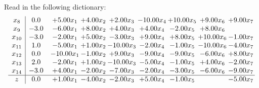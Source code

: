 \documentclass[9pt]{article}
\begin{document}
Read in the following dictionary:
\[\begin{array}{c| c c@{\hskip 2pt} c@{\hskip 2pt} c@{\hskip 2pt} c@{\hskip 2pt} c@{\hskip 2pt} c@{\hskip 2pt} c@{\hskip 2pt} }
 x_{8}   &  0.0 & +  5.00 x_{1} & +  4.00 x_{2} & +  2.00 x_{3} & -10.00 x_{4} & + 10.00 x_{5} & +  9.00 x_{6} & +  9.00 x_{7}\\
 x_{9}   &  -3.0 & -6.00 x_{1} & +  8.00 x_{2} & +  4.00 x_{3} & +  4.00 x_{4} & -2.00 x_{5} & +  8.00 x_{6} &   \\
 x_{10}   &  -3.0 & -2.00 x_{1} & +  5.00 x_{2} & -3.00 x_{3} & +  9.00 x_{4} & +  8.00 x_{5} & + 10.00 x_{6} & -1.00 x_{7}\\
 x_{11}   &  1.0 & -5.00 x_{1} & +  1.00 x_{2} & -10.00 x_{3} & -2.00 x_{4} & -1.00 x_{5} & -10.00 x_{6} & -4.00 x_{7}\\
 x_{12}   &  0.0 & -10.00 x_{1} & -1.00 x_{2} & +  9.00 x_{3} & -9.00 x_{4} & -9.00 x_{5} & -6.00 x_{6} & +  8.00 x_{7}\\
 x_{13}   &  2.0 & -2.00 x_{1} & +  1.00 x_{2} & -10.00 x_{3} & -5.00 x_{4} & -1.00 x_{5} & +  4.00 x_{6} & -2.00 x_{7}\\
 x_{14}   &  -3.0 & +  4.00 x_{1} & -2.00 x_{2} & -7.00 x_{3} & -2.00 x_{4} & -3.00 x_{5} & -6.00 x_{6} & -9.00 x_{7}\\
\hline
z    &  0.0 & +  1.00 x_{1} & -4.00 x_{2} & -2.00 x_{3} & +  5.00 x_{4} & -1.00 x_{5} &   & -5.00 x_{7}\\
\end{array}\]
\end{document}
